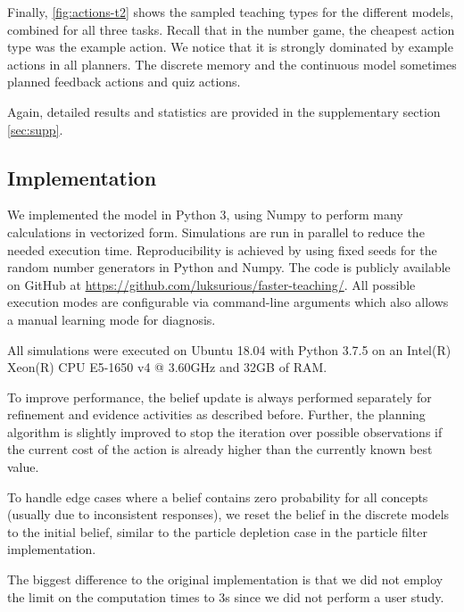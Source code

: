 Finally, \autoref{fig:actions-t2} shows the sampled teaching types for the different models, combined for all three tasks.
Recall that in the number game, the cheapest action type was the example action.
We notice that it is strongly dominated by example actions in all planners.
The discrete memory and the continuous model sometimes planned feedback actions and quiz actions.

Again, detailed results and statistics are provided in the supplementary section \ref{sec:supp}.

\subsection{Implementation}

We implemented the model in Python 3, using Numpy to perform many calculations in vectorized form.
Simulations are run in parallel to reduce the needed execution time. 
Reproducibility is achieved by using fixed seeds for the random number generators in Python and Numpy. 
The code is publicly available on GitHub at \url{https://github.com/luksurious/faster-teaching/}. 
All possible execution modes are configurable via command-line arguments which also allows a manual learning mode for diagnosis. 

All simulations were executed on Ubuntu 18.04 with Python 3.7.5 on an Intel(R) Xeon(R) CPU E5-1650 v4 @ 3.60GHz and 32GB of RAM.

To improve performance, the belief update is always performed separately for refinement and evidence activities as described before. 
Further, the planning algorithm is slightly improved to stop the iteration over possible observations if the current cost of the action is already higher than the currently known best value.

To handle edge cases where a belief contains zero probability for all concepts (usually due to inconsistent responses), we reset the belief in the discrete models to the initial belief, similar to the particle depletion case in the particle filter implementation.


The biggest difference to the original implementation is that we did not employ the limit on the computation times to 3s since we did not perform a user study.
